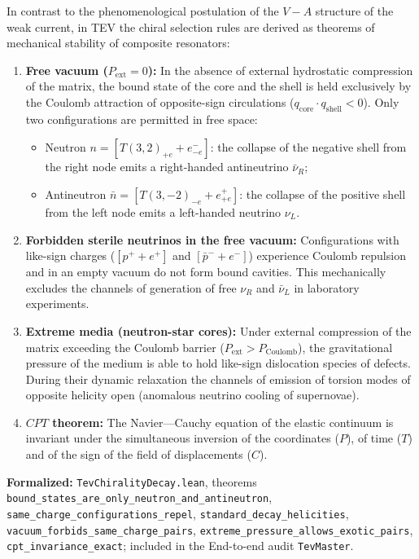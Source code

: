 \documentclass[11pt,a4paper]{article}
\theoremstyle{definition}
\theoremstyle{remark}
\begin{document}
In contrast to the phenomenological postulation of the $V - A$ structure of the weak current, in TEV the chiral selection rules are derived as theorems of mechanical stability of composite resonators:

\begin{enumerate}
\item \textbf{Free vacuum ($P_{\mathrm{ext}} = 0$):} In the absence of external hydrostatic compression of the matrix, the bound state of the core and the shell is held exclusively by the Coulomb attraction of opposite-sign circulations ($q_{\mathrm{core}} \cdot q_{\mathrm{shell}} < 0$). Only two configurations are permitted in free space:
\begin{itemize}
\item Neutron $n = [T(3,2)_{+e} + e^-_{-e}]$: the collapse of the negative shell from the right node emits a right-handed antineutrino $\bar{\nu}_R$;
\item Antineutron $\bar{n} = [T(3,-2)_{-e} + e^+_{+e}]$: the collapse of the positive shell from the left node emits a left-handed neutrino $\nu_L$.
\end{itemize}
\item \textbf{Forbidden sterile neutrinos in the free vacuum:} Configurations with like-sign charges ($[p^+ + e^+]$ and $[\bar{p}^- + e^-]$) experience Coulomb repulsion and in an empty vacuum do not form bound cavities. This mechanically excludes the channels of generation of free $\nu_R$ and $\bar{\nu}_L$ in laboratory experiments.
\item \textbf{Extreme media (neutron-star cores):} Under external compression of the matrix exceeding the Coulomb barrier ($P_{\mathrm{ext}} > P_{\mathrm{Coulomb}}$), the gravitational pressure of the medium is able to hold like-sign dislocation species of defects. During their dynamic relaxation the channels of emission of torsion modes of opposite helicity open (anomalous neutrino cooling of supernovae).
\item \textbf{$CPT$ theorem:} The Navier---Cauchy equation of the elastic continuum is invariant under the simultaneous inversion of the coordinates ($P$), of time ($T$) and of the sign of the field of displacements ($C$).
\end{enumerate}

\noindent\small\textbf{Formalized:} \texttt{TevChiralityDecay.lean}, theorems \texttt{bound\_states\_are\_only\_neutron\_and\_antineutron}, \texttt{same\_charge\_configurations\_repel}, \texttt{standard\_decay\_helicities}, \texttt{vacuum\_forbids\_same\_charge\_pairs}, \texttt{extreme\_pressure\_allows\_exotic\_pairs}, \texttt{cpt\_invariance\_exact}; included in the End-to-end audit \texttt{TevMaster}.
\end{document}
